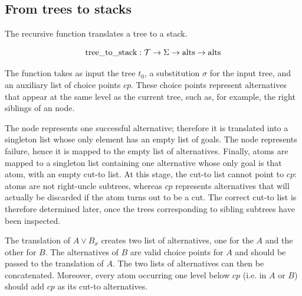 \subsection{From trees to stacks}\label{sec:t2l}

The \ttl recursive function translates a tree to a stack.

$$
\mathrm{tree\_to\_stack} : \mathcal{T} \to \Sigma \to \mathrm{alts} \to \mathrm{alts}
$$


The function \ttl takes as input the tree $t_0$, a substitution
$\sigma$ for the input tree, and an auxiliary list of choice points $cp$.
These choice points
represent alternatives that appear at the same level as the current
tree, such as, for example, the right siblings of an \orC{} node. 

The \okC node represents one successful alternative; therefore it is translated
into a singleton list whose only element has an empty list of goals. The \koC
node represents failure, hence it is mapped to the empty list of alternatives.
Finally, atoms are mapped to a singleton list containing one alternative whose
only goal is that atom, with an empty cut-to list.
At this stage, the cut-to list cannot point to $cp$: atoms are not
right-uncle subtrees, whereas $cp$ represents alternatives that will actually
be discarded if the atom turns out to be a cut. The correct cut-to list is
therefore determined later, once the trees corresponding to sibling subtrees
have been inspected.

The translation of $A \lor B_\sigma$ creates two list of alternatives,
one for the $A$ and the other for $B$. The alternatives of $B$ are valid
choice points for $A$ and should be passed to the translation of $A$.
The two lists of alternatives can then be concatenated. Moreover, every atom
occurring one level below $cp$ (i.e. in $A$ or $B$) should add $cp$ as its
cut-to alternatives.

